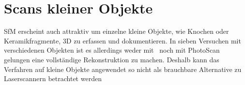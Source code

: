 			
	\section{Scans kleiner Objekte}
		SfM erscheint auch attraktiv um einzelne kleine Objekte, wie Knochen oder Keramikfragmente, 3D zu erfassen und dokumentieren. In sieben Versuchen mit verschiedenen Objekten ist es allerdings weder mit \dronarch\ noch mit PhotoScan gelungen eine vollständige Rekonstruktion zu machen. Deshalb kann das Verfahren auf kleine Objekte angewendet so nicht als brauchbare Alternative zu Laserscannern betrachtet werden
		